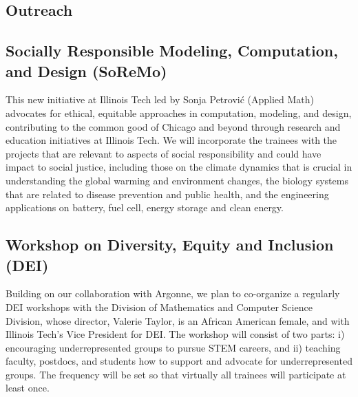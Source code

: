 \documentclass[11pt]{NSFamsart}
\newcommand{\FredNote}[1]{{\color{blue} Fred: #1}}
\begin{document}



 
\subsection{Outreach}
\subsection*{Socially Responsible Modeling, Computation, and Design
(SoReMo)}
This new initiative at Illinois Tech led by Sonja Petrovi\'c (Applied Math) advocates for ethical, equitable approaches in computation,
modeling, and design, contributing to the common good of Chicago and
beyond through research and education initiatives at Illinois Tech.
 We will incorporate the trainees with the projects that are relevant to aspects of social responsibility and could have impact to social justice, including those on the climate dynamics that is crucial in understanding the global warming and environment changes, the biology systems that are related to disease prevention and public health,  and the engineering applications on battery, fuel cell, energy storage and clean energy.


\subsection*{Workshop on Diversity, Equity and Inclusion (DEI)}
Building on our collaboration with Argonne, we plan to co-organize a regularly DEI workshops with the Division of Mathematics and Computer Science Division, whose director, Valerie Taylor, is an African American female, and with Illinois Tech's  Vice President for DEI.  The workshop will consist of two parts: i) encouraging underrepresented groups to pursue STEM careers, and ii) teaching faculty, postdocs, and students how to support and advocate for underrepresented groups.  The frequency will be set so that virtually all trainees will participate at least once.
\end{document}
